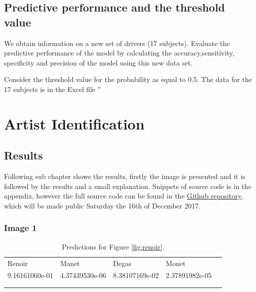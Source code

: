 \subsection{Predictive performance and the threshold value}

We obtain information on a new set of drivers (17 subjects). Evaluate the predictive performance of the model
by calculating the accuracy,sensitivity, specificity and precision of the model using this new data set.

Consider the threshold value for the probability as equal to 0.5. The data for the 17 subjects is in the Excel file ”

\section{Artist Identification}

\subsection{Results}
\label{section:Results}
Following sub chapter shows the results, firstly the image is presented and it is followed by the results and a small explanation. Snippets of source code is in the appendix, however the full source code can be found in the \textcolor{blue}{\href{https://github.com/Spiderixius/DataScienceAssignments2017/tree/master/AssignmentEsmail}{Github repository}}, which will be made public Saturday the 16th of December 2017.



\subsubsection*{Image 1}

\begin{table}[H]
    \centering
    \caption{Predictions for Figure \ref{fig:renoir}.}
    \label{tbl:renoir_predictions}
    \begin{tabular}{lllll}
    \cline{1-4}
    \multicolumn{1}{|l|}{Renoir}         & \multicolumn{1}{l|}{Manet}          & \multicolumn{1}{l|}{Degas}          & \multicolumn{1}{l|}{Monet}          &  \\ \cline{1-4}
    \multicolumn{1}{|l|}{9.16161060e-01} & \multicolumn{1}{l|}{4.37439530e-06} & \multicolumn{1}{l|}{8.38107169e-02} & \multicolumn{1}{l|}{2.37891982e-05} &  \\ \cline{1-4}
                                         &                                     &                                     &                                     &  \\
                                         &                                     &                                     &                                     & 
    \end{tabular}
\end{table}


